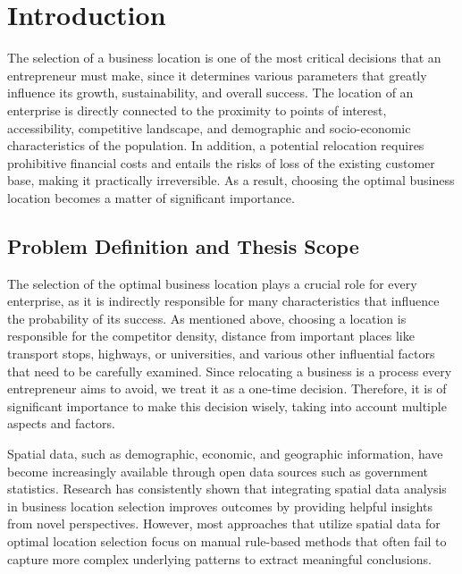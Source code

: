 \chapter{Introduction}
\label{chap1}


The selection of a business location is one of the most critical decisions that an entrepreneur must make, since it determines various parameters that greatly influence its growth, sustainability, and overall success. The location of an enterprise is directly connected to the proximity to points of interest, accessibility, competitive landscape, and demographic and socio-economic characteristics of the population. In addition, a potential relocation requires prohibitive financial costs and entails the risks of loss of the existing customer base, making it practically irreversible. As a result, choosing the optimal business location becomes a matter of significant importance.

  

\section{Problem Definition and Thesis Scope}


The selection of the optimal business location plays a crucial role for every enterprise, as it is indirectly responsible for many characteristics that influence the probability of its success. As mentioned above, choosing a location is responsible for the competitor density, distance from important places like transport stops, highways, or universities, and various other influential factors that need to be carefully examined. Since relocating a business is a process every entrepreneur aims to avoid, we treat it as a one-time decision. Therefore, it is of significant importance to make this decision wisely, taking into account multiple aspects and factors.

Spatial data, such as demographic, economic, and geographic information, have become increasingly available through open data sources such as government statistics. Research has consistently shown that integrating spatial data analysis in business location selection improves outcomes by providing helpful insights from novel perspectives. However, most approaches that utilize spatial data for optimal location selection focus on manual rule-based methods that often fail to capture more complex underlying patterns to extract meaningful conclusions.

